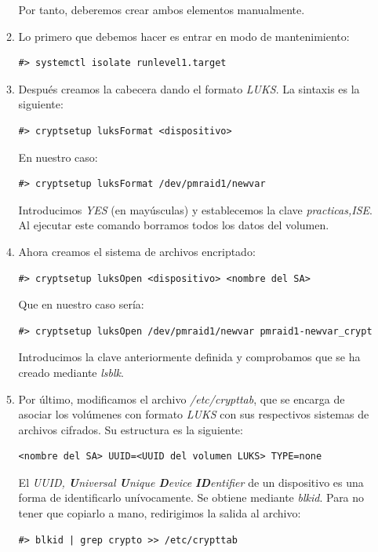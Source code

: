 \documentclass[12pt,spanish]{article}
\begin{document}
\begin{enumerate}
\begin{enumerate}
\begin{figure}[H]
			\end{figure}
			Por tanto, deberemos crear ambos elementos manualmente.
			\item Lo primero que debemos hacer es entrar en modo de mantenimiento:
			\begin{lstlisting}[xleftmargin=-3.8cm]
				#> systemctl isolate runlevel1.target
			\end{lstlisting}
			\item Después creamos la cabecera dando el formato \textit{LUKS}. La sintaxis es la siguiente:
			\begin{lstlisting}[xleftmargin=-3.8cm]
				#> cryptsetup luksFormat <dispositivo>
			\end{lstlisting}
			En nuestro caso:
			\begin{lstlisting}[xleftmargin=-3.8cm]
				#> cryptsetup luksFormat /dev/pmraid1/newvar
			\end{lstlisting}
			Introducimos \textit{YES} (en mayúsculas) y establecemos la clave \textit{practicas,ISE}. Al ejecutar este comando borramos todos los datos del volumen.
			\item Ahora creamos el sistema de archivos encriptado:
			\begin{lstlisting}[xleftmargin=-3.9cm]
				#> cryptsetup luksOpen <dispositivo> <nombre del SA>
			\end{lstlisting}
			Que en nuestro caso sería:
			\begin{lstlisting}[xleftmargin=-3.8cm]
				#> cryptsetup luksOpen /dev/pmraid1/newvar pmraid1-newvar_crypt
			\end{lstlisting}
			Introducimos la clave anteriormente definida y comprobamos que se ha creado mediante \textit{lsblk}.
			\item Por último, modificamos el archivo \textit{/etc/crypttab}, que se encarga de asociar los volúmenes con formato \textit{LUKS} con sus respectivos sistemas de archivos cifrados. Su estructura es la siguiente:
			\begin{lstlisting}[xleftmargin=-3.8cm]
				<nombre del SA> UUID=<UUID del volumen LUKS> TYPE=none
			\end{lstlisting}
			El \textit{UUID, \textbf{U}niversal \textbf{U}nique \textbf{D}evice \textbf{ID}entifier} de un dispositivo es una forma de identificarlo unívocamente. Se obtiene mediante \textit{blkid}. Para no tener que copiarlo a mano, redirigimos la salida al archivo:
			\begin{lstlisting}[xleftmargin=-3.8cm]
				#> blkid | grep crypto >> /etc/crypttab
			\end{lstlisting}

\end{enumerate}
\end{enumerate}
\end{document}
